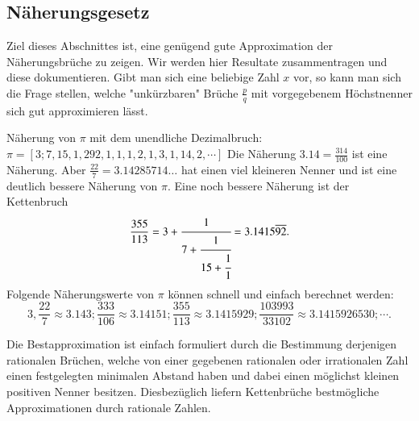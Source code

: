 \subsection{Näherungsgesetz}
Ziel dieses Abschnittes ist, eine genügend gute Approximation der
Näherungsbrüche zu zeigen. Wir werden hier Resultate zusammentragen und 
diese dokumentieren. Gibt man sich eine beliebige Zahl $x$
vor, so kann man sich die Frage stellen, welche "unkürzbaren" Brüche
$\frac{p}{q}$ mit vorgegebenem Höchstnenner sich gut approximieren
lässt. 
\begin{beispiel}
Näherung von $\pi$ mit dem unendliche Dezimalbruch:
$\pi = [3;7,15,1,292,1,1,1,2,1,3,1,14,2,\cdots]$
Die Näherung $3.14 = \frac{314}{100}$ ist eine Näherung. Aber
$\frac{22}{7} = 3.14285714\dots$ hat einen viel kleineren Nenner und
ist eine deutlich bessere Näherung von $\pi$.
Eine noch bessere Näherung ist der Kettenbruch
\begin{equation}
\frac{355}{113} = 3 + \cfrac{1}{7+\cfrac{1}{15+\cfrac{1}{1}}} = 3.1415\overline{92}.
\end{equation}
Folgende Näherungswerte von $\pi$ können schnell und einfach berechnet werden:
\begin{equation}
3,\frac{22}{7} \approx 3.143 ; \frac{333}{106} \approx 3.14151 ; \frac{355}{113} 
\approx 3.1415929 ; \frac{103993}{33102} \approx 3.1415926530 ; \cdots.
\end{equation}
\end{beispiel}
Die Bestapproximation ist einfach formuliert durch die Bestimmung
derjenigen rationalen Brüchen, welche von einer gegebenen rationalen
oder irrationalen Zahl einen festgelegten minimalen Abstand haben
und dabei einen möglichst kleinen positiven Nenner besitzen. Diesbezüglich liefern Kettenbrüche
bestmögliche Approximationen durch rationale Zahlen. \cite{kettenbruch:numerical-analysis}

